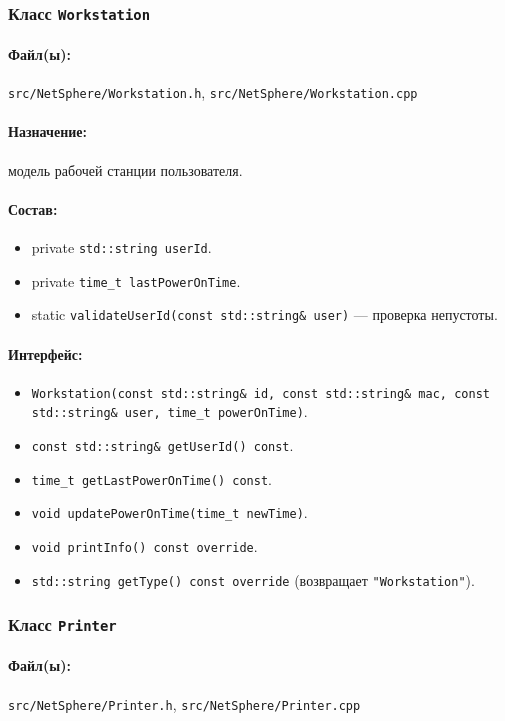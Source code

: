 \documentclass[14pt,a4paper]{extarticle}
\begin{document}
\subsubsection{Класс \texttt{Workstation}}
\paragraph{Файл(ы):} \texttt{src/NetSphere/Workstation.h}, \texttt{src/NetSphere/Workstation.cpp}
\paragraph{Назначение:} модель рабочей станции пользователя.
\paragraph{Состав:}
\begin{itemize}
  \item private \texttt{std::string userId}.
  \item private \texttt{time\_t lastPowerOnTime}.
  \item static \texttt{validateUserId(const std::string\& user)} --- проверка непустоты.
\end{itemize}
\paragraph{Интерфейс:}
\begin{itemize}
  \item \texttt{Workstation(const std::string\& id, const std::string\& mac, const std::string\& user, time\_t powerOnTime)}.
  \item \texttt{const std::string\& getUserId() const}.
  \item \texttt{time\_t getLastPowerOnTime() const}.
  \item \texttt{void updatePowerOnTime(time\_t newTime)}.
  \item \texttt{void printInfo() const override}.
  \item \texttt{std::string getType() const override} (возвращает \texttt{"Workstation"}).
\end{itemize}

\subsubsection{Класс \texttt{Printer}}
\paragraph{Файл(ы):} \texttt{src/NetSphere/Printer.h}, \texttt{src/NetSphere/Printer.cpp}
\end{document}
